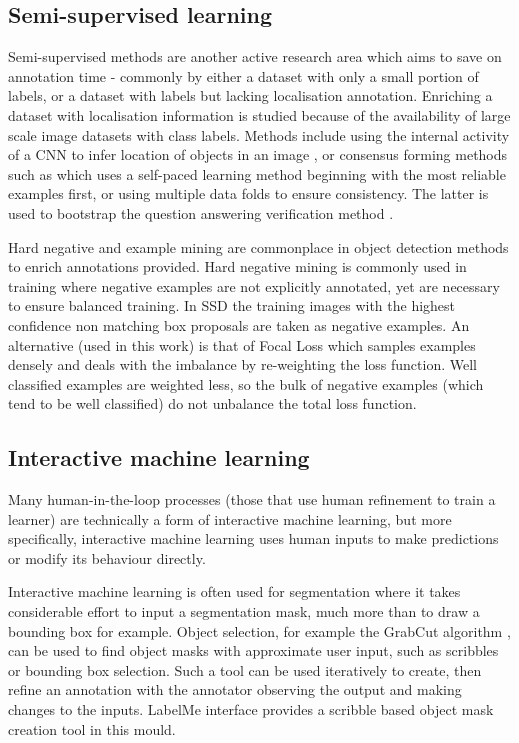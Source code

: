 \subsection{Semi-supervised learning}

Semi-supervised methods are another active research area which aims to save on annotation time - commonly by either a dataset with only a small portion of labels, or a dataset with labels but lacking localisation annotation. Enriching a dataset with localisation information is studied because of the availability of large scale image datasets with class labels. Methods include using the internal activity of a \gls{CNN} to infer location of objects in an image \cite{Sivic2015}, or consensus forming methods such as \cite{Sangineto} which uses a self-paced learning method beginning with the most reliable examples first, or \cite{Cinbis2017} using multiple data folds to ensure consistency. The latter is used to bootstrap the question answering verification method \cite{Papadopoulos2016}.

Hard negative and example mining are commonplace in object detection methods to enrich annotations provided. Hard negative mining is commonly used in training where negative examples are not explicitly annotated, yet are necessary to ensure balanced training. In \gls{SSD} \cite{Liu2016a} the training images with the highest confidence non matching  box proposals are taken as negative examples. An alternative (used in this work) is that of Focal Loss \cite{Lin2017} which samples examples densely and deals with the imbalance by re-weighting the loss function. Well classified examples are weighted less, so the bulk of negative examples (which tend to be well classified) do not unbalance the total loss function.

\subsection{Interactive machine learning}

Many human-in-the-loop processes (those that use human refinement to train a learner) are technically a form of interactive machine learning, but more specifically, interactive machine learning uses human inputs to make predictions or modify its behaviour directly.

Interactive machine learning is often used for segmentation where it takes considerable effort to input a segmentation mask, much more than to draw a bounding box for example. Object selection, for example the GrabCut algorithm \cite{Rother}, can be used to find object masks with approximate user input, such as scribbles or bounding box selection. Such a tool can be used iteratively to create, then refine an annotation with the annotator observing the output and making changes to the inputs.  LabelMe \cite{Russell2007} interface provides a scribble based object mask creation tool in this mould. 

